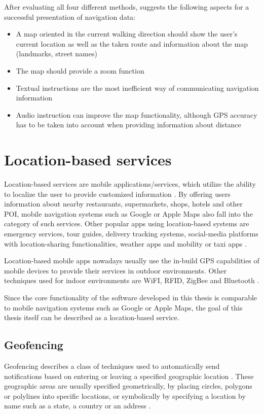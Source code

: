 After evaluating all four different methods, \cite{visual_design_of_navigation_system} suggests the following aspects for a successful presentation of navigation data:

\begin{itemize}
    \item A map oriented in the current walking direction should show the user's current location as well as the taken route and information about the map (landmarks, street names)
    \item The map should provide a zoom function
    \item Textual instructions are the most inefficient way of communicating navigation information
    \item Audio instruction can improve the map functionality, although GPS accuracy has to be taken into account when providing information about distance
\end{itemize}

\section{Location-based services}
Location-based services are mobile applications/services, which utilize the ability to localize the user to provide customized information \cite{location_based_services}. By offering users information about nearby restaurants, supermarkets, shops, hotels and other POI, mobile navigation systems such as Google \cite{google_maps_website} or Apple Maps \cite{apple_maps_website} also fall into the category of such services. Other popular apps using location-based systems are emergency services, tour guides, delivery tracking systems, social-media platforms with location-sharing functionalities, weather apps and mobility or taxi apps \cite{geofencing_and_background_tracking} \cite{Sadhukhan2021}.

Location-based mobile apps nowadays usually use the in-build GPS capabilities of mobile devices to provide their services in outdoor environments. Other techniques used for indoor environments are WiFI, RFID, ZigBee and Bluetooth \cite{Sadhukhan2021}.

Since the core functionality of the software developed in this thesis is comparable to mobile navigation systems such as Google or Apple Maps, the goal of this thesis itself can be described as a location-based service.

\subsection{Geofencing}
Geofencing describes a class of techniques used to automatically send notifications based on entering or leaving a specified geographic location \cite{geofencing}. These geographic areas are usually specified geometrically, by placing circles, polygons or polylines into specific locations, or symbolically by specifying a location by name such as a state, a country or an address \cite{geofencing}.

